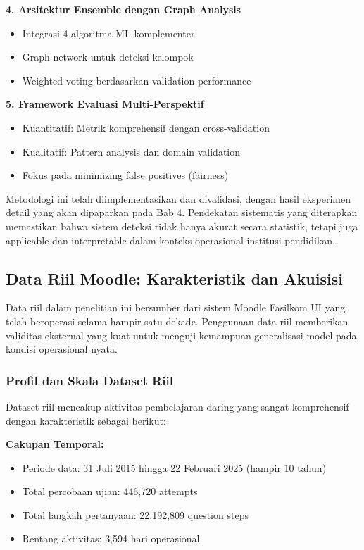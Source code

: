 \textbf{4. Arsitektur Ensemble dengan Graph Analysis}
\begin{itemize}
    \item Integrasi 4 algoritma ML komplementer
    \item Graph network untuk deteksi kelompok
    \item Weighted voting berdasarkan validation performance
\end{itemize}

\textbf{5. Framework Evaluasi Multi-Perspektif}
\begin{itemize}
    \item Kuantitatif: Metrik komprehensif dengan cross-validation
    \item Kualitatif: Pattern analysis dan domain validation
    \item Fokus pada minimizing false positives (fairness)
\end{itemize}

Metodologi ini telah diimplementasikan dan divalidasi, dengan hasil eksperimen detail yang akan dipaparkan pada Bab 4. Pendekatan sistematis yang diterapkan memastikan bahwa sistem deteksi tidak hanya akurat secara statistik, tetapi juga applicable dan interpretable dalam konteks operasional institusi pendidikan.

\subsection{Data Riil Moodle: Karakteristik dan Akuisisi}
\label{sec:dataRiilMoodle}

Data riil dalam penelitian ini bersumber dari sistem Moodle Fasilkom UI yang telah beroperasi selama hampir satu dekade. Penggunaan data riil memberikan validitas eksternal yang kuat untuk menguji kemampuan generalisasi model pada kondisi operasional nyata.

\subsubsection{Profil dan Skala Dataset Riil}
\label{sec:profilDatasetRiil}

Dataset riil mencakup aktivitas pembelajaran daring yang sangat komprehensif dengan karakteristik sebagai berikut:

\textbf{Cakupan Temporal:}
\begin{itemize}
    \item Periode data: 31 Juli 2015 hingga 22 Februari 2025 (hampir 10 tahun)
    \item Total percobaan ujian: 446,720 attempts
    \item Total langkah pertanyaan: 22,192,809 question steps
    \item Rentang aktivitas: 3,594 hari operasional
\end{itemize}

